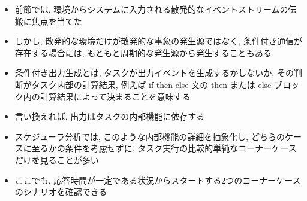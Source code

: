 \begin{frame}{}
    \begin{itemize}
        \item 前節では, 環境からシステムに入力される散発的なイベントストリームの伝搬に焦点を当てた
        \item しかし, 散発的な環境だけが散発的な事象の発生源ではなく, 条件付き通信が存在する場合には, もともと周期的な発生源から発生することもある
    \end{itemize}
\end{frame}

\begin{frame}{}
    \begin{itemize}
        \item 条件付き出力生成とは, タスクが出力イベントを生成するかしないか, その判断がタスク内部の計算結果, 例えば if-then-else 文の then または else ブロック内の計算結果によって決まることを意味する
        \item 言い換えれば, 出力はタスクの内部機能に依存する
        \item スケジューラ分析では, このような内部機能の詳細を抽象化し, どちらのケースに至るかの条件を考慮せずに, タスク実行の比較的単純なコーナーケースだけを見ることが多い
    \end{itemize}
\end{frame}

\begin{frame}{}
    \begin{itemize}
        \item ここでも, 応答時間が一定である状況からスタートする2つのコーナーケースのシナリオを確認できる
    \end{itemize}
\end{frame}

\begin{frame}{}
\end{frame}

\begin{frame}{}
\end{frame}

